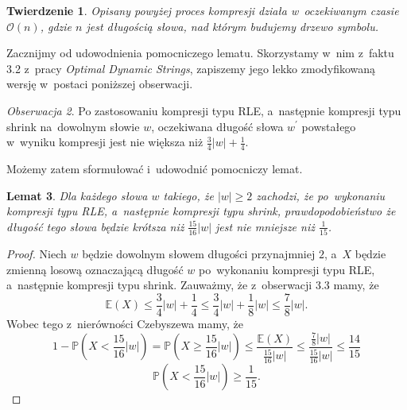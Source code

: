 \documentclass[declaration,shortabstract]{iithesis}
\theoremstyle{definition} \newtheorem{definition}{Definicja}[chapter]
\theoremstyle{remark} \newtheorem{remark}[definition]{Obserwacja}
\theoremstyle{plain} \newtheorem{theorem}[definition]{Twierdzenie}
\theoremstyle{remark} \newtheorem{example}{Przykład}[definition]
\theoremstyle{plain} \newtheorem{lemma}[definition]{Lemat}
\begin{document}
\begin{theorem}
    Opisany powyżej proces kompresji działa w~oczekiwanym czasie $\mathcal{O}(n)$, gdzie $n$ jest długością słowa, nad którym budujemy drzewo symbolu.
\end{theorem}

Zacznijmy od udowodnienia pomocniczego lematu. Skorzystamy w~nim z~faktu 3.2 z~pracy \textit{Optimal Dynamic Strings}, zapiszemy jego lekko zmodyfikowaną wersję w~postaci poniższej obserwacji.
\begin{remark}
    Po zastosowaniu kompresji typu RLE, a~następnie kompresji typu shrink na~dowolnym słowie $w$, oczekiwana długość słowa $w^\prime$ powstałego w~wyniku kompresji jest nie większa niż $\frac{3}{4}|w| + \frac{1}{4}$.
\end{remark}
Możemy zatem sformułować i~udowodnić pomocniczy lemat.
\begin{lemma}
    Dla każdego słowa $w$ takiego, że $|w| \geq 2$ zachodzi, że po~wykonaniu kompresji typu RLE, a~następnie kompresji typu shrink, prawdopodobieństwo że długość tego słowa będzie krótsza niż $\frac{15}{16}|w|$ jest nie mniejsze niż $\frac{1}{15}$. 
\end{lemma}
\begin{proof}
    Niech $w$ będzie dowolnym słowem długości przynajmniej $2$, a~$X$ będzie zmienną losową oznaczającą długość $w$ po~wykonaniu kompresji typu RLE, a~następnie kompresji typu shrink. Zauważmy, że z~obserwacji 3.3 mamy, że $$\mathbb{E} (X) \leq \frac{3}{4}|w| + \frac{1}{4} \leq \frac{3}{4}|w| + \frac{1}{8}|w| \leq \frac{7}{8}|w|.$$ Wobec tego z~nierówności Czebyszewa mamy, że $$1 - \mathbb{P}(X < \frac{15}{16}|w|) = \mathbb{P}(X \geq \frac{15}{16}|w|) \leq \frac{\mathbb{E} (X)}{\frac{15}{16}|w|} \leq \frac{\frac{7}{8}|w|}{\frac{15}{16}|w|} \leq \frac{14}{15}$$ $$\mathbb{P}(X < \frac{15}{16}|w|) \geq \frac{1}{15}.$$
\end{proof}
\end{document}
